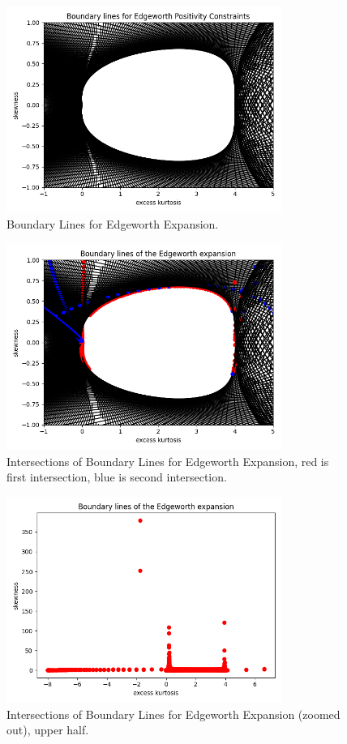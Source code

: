 \begin{figure}[h]
    \centering
    \includegraphics[width=0.8\textwidth]{img/edgeworth_positivity_boundary_lines.png}
    \caption{Boundary Lines for Edgeworth Expansion.}
    \label{fig:ew_boundary_lines}
\end{figure}
\begin{figure}[h]
    \centering
    \includegraphics[width=0.8\textwidth]{img/edgeworth_positivity_boundary_intersections_1.png}
    \caption{Intersections of Boundary Lines for Edgeworth Expansion, red is first intersection, blue is second intersection.}
    \label{fig:ew_boundary_intersections_1}
\end{figure}
\begin{figure}[h]
    \centering
    \includegraphics[width=0.8\textwidth]{img/edgeworth_positivity_boundary_intersections_3.png}
    \caption{Intersections of Boundary Lines for Edgeworth Expansion (zoomed out), upper half.}
    \label{fig:ew_boundary_intersections_3}
\end{figure}
